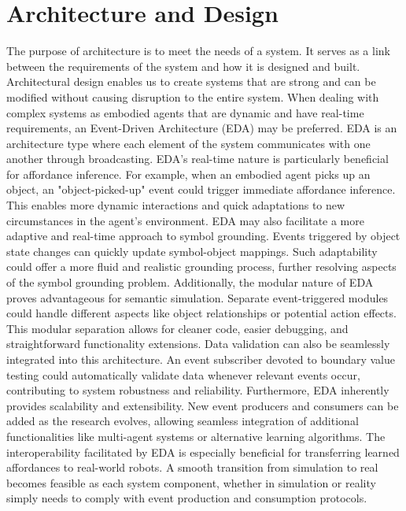 \documentclass[11pt]{article}
\begin{document}
\section{Architecture and Design}
The purpose of architecture is to meet the needs of a system. It serves as a link between the requirements of the system and how it is designed and built. Architectural design enables us to create systems that are strong and can be modified without causing disruption to the entire system\cite{serban2022adapting}. When dealing with complex systems as embodied agents that are dynamic and have real-time requirements, an Event-Driven Architecture (EDA) may be preferred. EDA is an architecture type where each element of the system communicates with one another through broadcasting.
EDA's real-time nature is particularly beneficial for affordance inference. For example, when an embodied agent picks up an object, an "object-picked-up" event could trigger immediate affordance inference. This enables more dynamic interactions and quick adaptations to new circumstances in the agent's environment. EDA may also facilitate a more adaptive and real-time approach to symbol grounding. Events triggered by object state changes can quickly update symbol-object mappings. Such adaptability could offer a more fluid and realistic grounding process, further resolving aspects of the symbol grounding problem.  Additionally, the modular nature of EDA proves advantageous for semantic simulation. Separate event-triggered modules could handle different aspects like object relationships or potential action effects. This modular separation allows for cleaner code, easier debugging, and straightforward functionality extensions. Data validation can also be seamlessly integrated into this architecture. An event subscriber devoted to boundary value testing could automatically validate data whenever relevant events occur, contributing to system robustness and reliability. Furthermore, EDA inherently provides scalability and extensibility. New event producers and consumers can be added as the research evolves, allowing seamless integration of additional functionalities like multi-agent systems or alternative learning algorithms. The interoperability facilitated by EDA is especially beneficial for transferring learned affordances to real-world robots. A smooth transition from simulation to real becomes feasible as each system component, whether in simulation or reality simply needs to comply with event production and consumption protocols.
\end{document}
